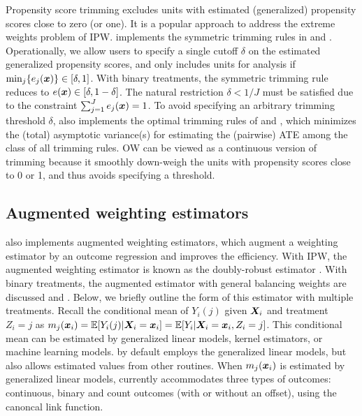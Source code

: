 Propensity score trimming excludes units with estimated (generalized) propensity scores close to zero (or one). It is a popular approach to address the extreme weights problem of IPW.  implements the symmetric trimming rules in \citet{Crump2009} and \citet{Yoshida2019}.  Operationally, we allow users to specify a single cutoff $\delta$ on the estimated generalized propensity scores, and only includes units for analysis if $\min_j\{e_{j}(\bm{x})\}\in[\delta,1]$. With binary treatments, the symmetric trimming rule reduces to $e(\bm{x})\in[\delta,1-\delta]$. The natural restriction $\delta<1/J$ must be satisfied due to the constraint  $\sum_{j=1}^J e_j(\bm{x})=1$.   
To avoid specifying an arbitrary trimming threshold $\delta$,  also implements the optimal trimming rules of \citet{Crump2009} and \citet{Yang2016}, which minimizes the (total) asymptotic variance(s) for estimating the (pairwise) ATE among the class of all trimming rules. OW can be viewed as a continuous version of trimming because it smoothly down-weigh the units with propensity scores close to 0 or 1, and thus avoids specifying a threshold.

\subsection{Augmented weighting estimators}
\label{sec:augest}

 also implements augmented weighting estimators, which augment a weighting estimator by an outcome regression and improves the efficiency.  With IPW, the augmented weighting estimator is known as the doubly-robust estimator \citep{Lunceford2004,bang2005doubly,funk2011doubly}. With binary treatments, the augmented estimator with general balancing weights are discussed \citet{Hirano2003} and \citet{Mao2018}. Below, we briefly outline the form of this estimator with multiple treatments. Recall the conditional mean of $Y_i(j)$ given $\bm{X}_i$ and treatment $Z_i=j$ as $m_{j}(\bm{x}_i)=\operatorname{\mathbb E}[Y_i(j)|\bm{X}_i=\bm{x}_i]=\operatorname{\mathbb E}[Y_i|\bm{X}_i=\bm{x}_i,Z_{i}=j]$.  
This conditional mean can be estimated by generalized linear models, kernel estimators, or machine learning models.  by default employs the generalized linear models, but also allows estimated values from other routines. When $m_{j}(\bm{x}_i)$ is estimated by generalized linear models,  currently accommodates three types of outcomes: continuous, binary and count outcomes (with or without an offset), using the canoncal link function.  

